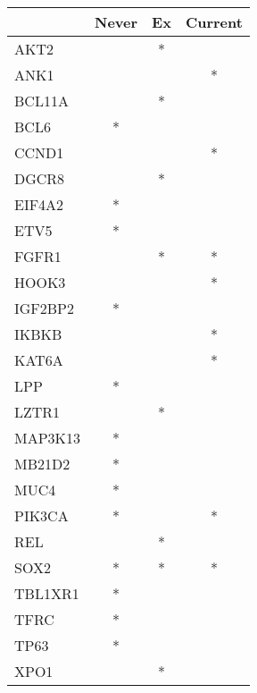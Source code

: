 \begin{tabular}{lccc}
\toprule
{} & Never & Ex & Current \\
\midrule
AKT2    &       &  * &         \\
ANK1    &       &    &       * \\
BCL11A  &       &  * &         \\
BCL6    &     * &    &         \\
CCND1   &       &    &       * \\
DGCR8   &       &  * &         \\
EIF4A2  &     * &    &         \\
ETV5    &     * &    &         \\
FGFR1   &       &  * &       * \\
HOOK3   &       &    &       * \\
IGF2BP2 &     * &    &         \\
IKBKB   &       &    &       * \\
KAT6A   &       &    &       * \\
LPP     &     * &    &         \\
LZTR1   &       &  * &         \\
MAP3K13 &     * &    &         \\
MB21D2  &     * &    &         \\
MUC4    &     * &    &         \\
PIK3CA  &     * &    &       * \\
REL     &       &  * &         \\
SOX2    &     * &  * &       * \\
TBL1XR1 &     * &    &         \\
TFRC    &     * &    &         \\
TP63    &     * &    &         \\
XPO1    &       &  * &         \\
\bottomrule
\end{tabular}
